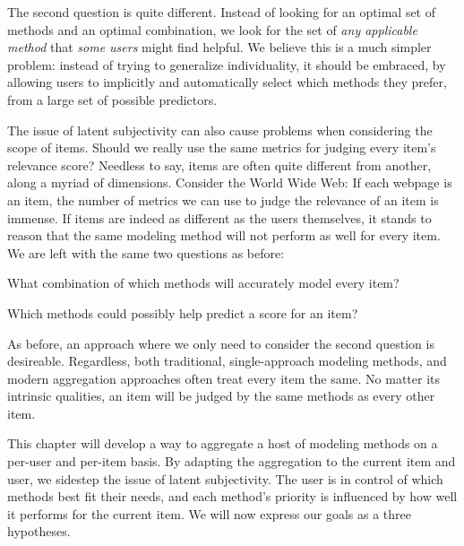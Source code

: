 The second question is quite different. 
Instead of looking for an optimal set of methods and an optimal combination,
we look for the set of \emph{any applicable method} that \emph{some users} might find helpful.
We believe this is a much simpler problem: 
instead of trying to generalize individuality,
it should be embraced, by allowing users to implicitly and automatically select which methods they prefer,
from a large set of possible predictors.

The issue of latent subjectivity can also cause problems when considering the scope of items.
Should we really use the same metrics for judging every item's relevance score?
Needless to say, items are often quite different from another,
along a myriad of dimensions. Consider the World Wide Web:
If each webpage is an item, the number of metrics we can use to judge
the relevance of an item is immense.
If items are indeed as different as the users themselves, it stands to reason that the same 
modeling method will not perform as well for every item.
We are left with the same two questions as before:

\begin{enumerate*}
  \item What combination of which methods will accurately model every item?
  \item Which methods could possibly help predict a score for an item?
\end{enumerate*}

As before, an approach where we only need to consider the second question is desireable.
Regardless, both traditional, single-approach modeling methods, and modern aggregation approaches
often treat every item the same. No matter its intrinsic qualities, an item will be judged
by the same methods as every other item. 

This chapter will develop a way to aggregate a host of modeling methods on a per-user and per-item basis.
By adapting the aggregation to the current item and user, we sidestep the issue of
latent subjectivity. The user is in control of which methods best fit their needs, and
each method's priority is influenced by how well it performs for the current item.
We will now express our goals as a three hypotheses.


\clearpage
